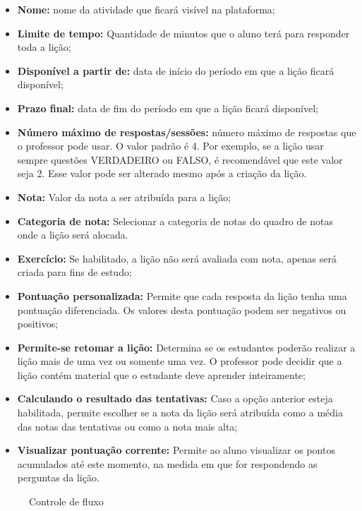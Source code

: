 \begin{itemize}
 \item \textbf{Nome:} nome da atividade que ficará visível na plataforma;
 \item \textbf{Limite de tempo:} Quantidade de minutos que o aluno terá para responder toda a lição;
 \item \textbf{Disponível a partir de:} data de início do período em que a lição ficará disponível;
 \item \textbf{Prazo final:} data de fim do período em que a lição ficará disponível;
 \item \textbf{Número máximo de respostas/sessões:} número máximo de respostas que o professor pode usar. O valor padrão é 4. Por exemplo, se a lição usar sempre questões VERDADEIRO ou FALSO, é recomendável que este valor seja 2. Esse valor pode ser alterado mesmo após a criação da lição.
 \item \textbf{Nota:} Valor da nota a ser atribuída para a lição;
 \item \textbf{Categoria de nota:} Selecionar a categoria de notas do quadro de notas onde a lição será alocada.
 \item \textbf{Exercício:} Se habilitado, a lição não será avaliada com nota, apenas será criada para fins de estudo;
 \item \textbf{Pontuação personalizada:} Permite que cada resposta da lição tenha uma pontuação diferenciada. Os valores desta pontuação podem ser negativos ou positivos;
 \item \textbf{Permite-se retomar a lição:} Determina se os estudantes poderão realizar a lição mais de uma vez ou somente uma vez. O professor pode decidir que a lição contém material que o estudante deve aprender inteiramente;
 \item \textbf{Calculando o resultado das tentativas:} Caso a opção anterior esteja habilitada, permite escolher se a nota da lição será atribuída como a média das notas das tentativas ou como a nota mais alta;
 \item \textbf{Visualizar pontuação corrente:} Permite ao aluno visualizar os pontos acumulados até este momento, na medida em que for respondendo as perguntas da lição.
\end{itemize}

\begin{figure}
 \begin{center}
  \caption{Controle de fluxo}
  \label{fig:cont_fluxo}
 \end{center}
\end{figure}

